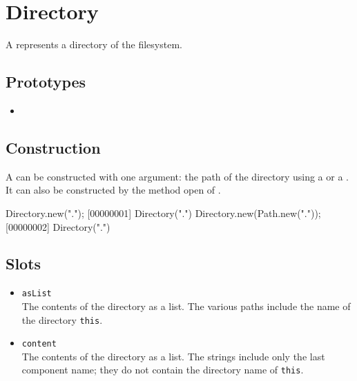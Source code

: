 \section{Directory}

A  represents a directory of the filesystem.

\subsection{Prototypes}
\begin{itemize}
\item {}
\end{itemize}

\subsection{Construction}

A  can be constructed with one argument: the path of
the directory using a  or a . It can
also be constructed by the method open of .

\begin{urbiscript}
Directory.new(".");
[00000001] Directory(".")
Directory.new(Path.new("."));
[00000002] Directory(".")
\end{urbiscript}

\subsection{Slots}
\begin{itemize}
\item \lstinline|asList|\\
  The contents of the directory as a  list.  The
  various paths include the name of the directory \lstinline|this|.

\item \lstinline|content|\\
  The contents of the directory as a  list.  The
  strings include only the last component name; they do not contain
  the directory name of \lstinline|this|.
\end{itemize}


